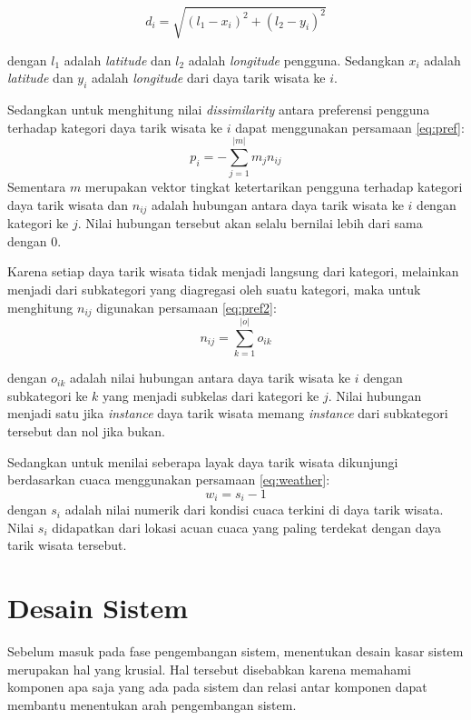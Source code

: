 \begin{enumerate}
\begin{equation}
d_i = \sqrt{(l_1 - x_i)^2 + (l_2 - y_i)^2}
\label{eq:euclidean} 
\end{equation}
\par
dengan $l_1$ adalah \textit{latitude} dan $l_2$ adalah \textit{longitude} pengguna. Sedangkan $x_i$ adalah \textit{latitude} dan $y_i$ adalah \textit{longitude} dari
daya tarik wisata ke $i$.
\par
Sedangkan untuk menghitung nilai \textit{dissimilarity} antara preferensi pengguna terhadap kategori daya tarik wisata ke $i$ dapat menggunakan persamaan \ref{eq:pref}:
\begin{equation}
p_i = -\sum_{j=1}^{|m|} m_j n_{ij}
\label{eq:pref} 
\end{equation}
Sementara $m$ merupakan vektor tingkat ketertarikan pengguna terhadap kategori daya tarik wisata 
dan $n_{ij}$ adalah hubungan antara daya tarik wisata ke $i$ dengan kategori ke $j$. Nilai hubungan tersebut akan selalu bernilai lebih dari sama dengan 0.
\par
Karena setiap daya tarik wisata tidak menjadi  langsung dari kategori, melainkan menjadi  dari subkategori yang diagregasi oleh suatu kategori,
maka untuk menghitung $n_{ij}$ digunakan persamaan \ref{eq:pref2}:
\begin{equation}
n_{ij} = \sum_{k=1}^{|o|} o_{ik}
\label{eq:pref2} 
\end{equation}
\par
dengan $o_{ik}$ adalah nilai hubungan antara daya tarik wisata ke $i$ dengan subkategori ke $k$ yang menjadi subkelas dari kategori ke $j$. Nilai hubungan menjadi satu jika
\textit{instance} daya tarik wisata memang \textit{instance} dari subkategori tersebut dan nol jika bukan.
\par
Sedangkan untuk menilai seberapa layak daya tarik wisata dikunjungi berdasarkan cuaca menggunakan persamaan \ref{eq:weather}:
\begin{equation}
w_i = s_i - 1
\label{eq:weather} 
\end{equation}
dengan $s_i$ adalah nilai numerik dari kondisi cuaca terkini di daya tarik wisata. Nilai $s_i$
didapatkan dari lokasi acuan cuaca yang paling terdekat dengan daya tarik wisata tersebut.

\end{enumerate}

\section{Desain Sistem}
Sebelum masuk pada fase pengembangan sistem, menentukan desain kasar sistem merupakan hal yang krusial. Hal tersebut disebabkan karena memahami komponen apa saja yang ada pada sistem dan relasi antar komponen dapat membantu menentukan arah pengembangan sistem. 

